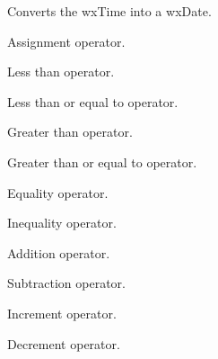 Converts the wxTime into a wxDate.

\label{wxtimeoperator}


Assignment operator.

\label{wxtimeoperatorle}


Less than operator.

\label{wxtimeoperatorleq}


Less than or equal to operator.

\label{wxtimeoperatorge}


Greater than operator.

\label{wxtimeoperatorgeq}


Greater than or equal to operator.

\label{wxtimeoperatoreq}


Equality operator.

\label{wxtimeoperatorneq}


Inequality operator.

\label{wxtimeoperatorplus}


Addition operator.

\label{wxtimeoperatorminus}


Subtraction operator.

\label{wxtimeoperatorpluseq}


Increment operator.

\label{wxtimeoperatorminuseq}


Decrement operator.

